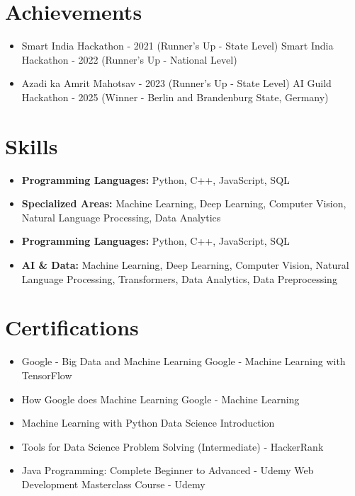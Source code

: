 \documentclass[a4paper,10pt]{article}
\begin{document}
\section*{Achievements}
\begin{itemize}
\item Smart India Hackathon - 2021 (Runner's Up - State Level) \hfill Smart India Hackathon - 2022 (Runner's Up - National Level)
\item Azadi ka Amrit Mahotsav - 2023 (Runner's Up - State Level) \hfill AI Guild Hackathon - 2025 (Winner - Berlin and Brandenburg State, Germany)
\end{itemize}

\section*{Skills}
\begin{itemize}
  \item \textbf{Programming Languages:} Python, C++, JavaScript, SQL
  \item \textbf{Specialized Areas:} Machine Learning, Deep Learning, Computer Vision, Natural Language Processing, Data Analytics
  \item \textbf{Programming Languages:} Python, C++, JavaScript, SQL
  \item \textbf{AI \& Data:} Machine Learning, Deep Learning, Computer Vision, Natural Language Processing, Transformers, Data Analytics, Data Preprocessing
\end{itemize}

\section*{Certifications}
\begin{itemize}
\item Google - Big Data and Machine Learning \hfill Google - Machine Learning with TensorFlow
\item How Google does Machine Learning \hfill Google - Machine Learning
\item Machine Learning with Python \hfill Data Science Introduction
\item Tools for Data Science \hfill Problem Solving (Intermediate) - HackerRank
\item Java Programming: Complete Beginner to Advanced - Udemy \hfill Web Development Masterclass Course - Udemy
\end{itemize}
\end{document}
